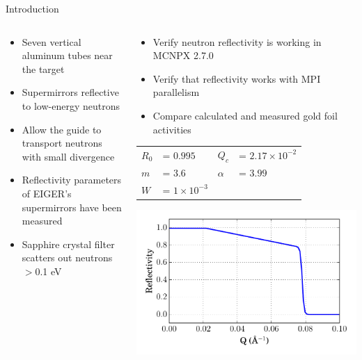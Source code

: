 \documentclass[final,t]{beamer}
\begin{document}
\begin{frame}{}
\begin{columns}[t]
\begin{column}{.3\linewidth}
\begin{block}{Introduction}
\begin{columns}
\begin{column}{.5\linewidth}
\begin{itemize}
\item Seven vertical aluminum tubes near the target 
\end{itemize}

  \begin{itemize} 
  \item Supermirrors reflective to low-energy neutrons \cite{mcnpx-ref}
  \item Allow the guide to transport neutrons with small divergence
  \item Reflectivity parameters of EIGER's supermirrors have been measured \cite{eiger-uwe}
  \item Sapphire crystal filter scatters out neutrons $>$0.1 eV \cite{freund}
  \end{itemize}
\end{column}

\begin{column}{.5\linewidth}
  \begin{itemize}
  \item Verify neutron reflectivity is working in MCNPX 2.7.0 \cite{mcnpx-ref,mcnpx270}
  \item Verify that reflectivity works with MPI parallelism
  \item Compare calculated and measured gold foil activities
  \end{itemize}

        \begin{tabular}{l l l l}
        $R_0$    & = $0.995           $ & $ Q_c  $  & = $ 2.17 \times 10^{-2} $\\
        $m  $    & = $3.6             $ & $\alpha$  & = $ 3.99 $ \\
        $W  $    & = $1 \times 10^{-3}$ & $      $  &   
        \end{tabular}

    \includegraphics*[width=\linewidth]{reflectivity_curve.pdf}


\end{column}
\end{columns}
\end{block}
\end{column}
\end{columns}
\end{frame}
\end{document}
